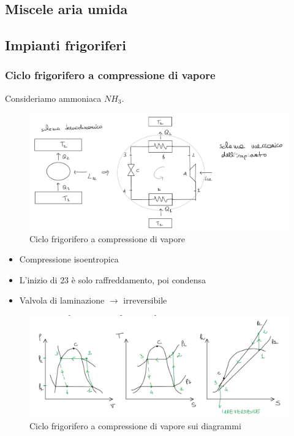 \documentclass[a4paper]{article}
\numberwithin{equation}{section}%
\begin{document}
\subsection{Miscele aria umida}

\subsection{Impianti frigoriferi}

\subsubsection{Ciclo frigorifero a compressione di vapore}
Consideriamo ammoniaca $NH_3$.
\begin{figure}[H]
	\begin{center}
		\includegraphics[width=0.8\columnwidth]{compressionedivapore.png}
	\end{center}
	\caption{Ciclo frigorifero a compressione di vapore}
\end{figure}

\begin{itemize}
\item Compressione isoentropica
\item L'inizio di $23$ è solo raffreddamento, poi condensa 
\item Valvola di laminazione $\rightarrow$ irreversibile 
\end{itemize}

\begin{figure}[H]
	\begin{center}
		\includegraphics[width=0.8\columnwidth]{diagrammicompressionedivapore.png}
	\end{center}
	\caption{Ciclo frigorifero a compressione di vapore sui diagrammi}
\end{figure}
\end{document}
